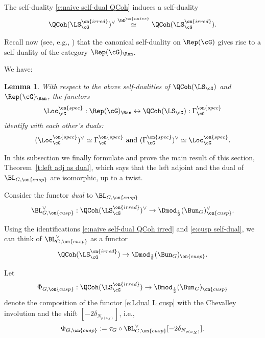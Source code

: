 \documentclass[9pt]{amsart}
\newtheorem{lem}[subsubsection]{Lemma}
\theoremstyle{remark}
\theoremstyle{definition}
\theoremstyle{remark}
\newcommand{\thmref}[1]{Theorem~\ref{#1}}
\numberwithin{equation}{section}
\begin{document}
\sssec{}

The self-duality \eqref{e:naive self-dual QCoh} induces a self-duality 
\begin{equation} \label{e:naive self-dual QCoh irred}
\QCoh(\LS^{\on{irred}}_\cG)^\vee \overset{\bD^{\on{naive}}}\simeq \QCoh(\LS^{\on{irred}}_\cG).
\end{equation} 

\sssec{}

Recall now (see, e.g.,  \cite[Sect. 11.3]{AGKRRV1}) that the canonical self-duality on $\Rep(\cG)$ gives rise to a self-duality of the category 
$\Rep(\cG)_\Ran$.

\sssec{}

We have:

\begin{lem} \label{l:Loc spec and dual}
With respect to the above self-dualities of $\QCoh(\LS_\cG)$ and $\Rep(\cG)_\Ran$, the 
functors 
$$\Loc_\cG^{\on{spec}}:\Rep(\cG)_\Ran \leftrightarrow \QCoh(\LS_\cG):\Gamma^{\on{spec}}_\cG$$
identify with each other's duals:
$$(\Loc_\cG^{\on{spec}})^\vee\simeq \Gamma^{\on{spec}}_\cG \text{ and }
(\Gamma^{\on{spec}}_\cG)^\vee \simeq \Loc_\cG^{\on{spec}}.$$
\end{lem} 


In this subsection we finally formulate and prove the main result of this section, \thmref{t:left adj as dual}, which says that
the left adjoint and the dual of $\BL_{G,\on{cusp}}$ are isomorphic, up to a twist. 

\sssec{} \label{sss:Phi cusp}

Consider the functor \emph{dual} to $\BL_{G,\on{cusp}}$
$$\BL_{G,\on{cusp}}^\vee: \QCoh(\LS_\cG^{\on{irred}})^\vee \to \Dmod_{\frac{1}{2}}(\Bun_G)_{\on{cusp}}^\vee.$$

Using the identifications \eqref{e:naive self-dual QCoh irred} and \eqref{e:cusp self-dual}, we can think of $\BL_{G,\on{cusp}}^\vee$ as a functor
\begin{equation} \label{e:Ldual L cusp}
\QCoh(\LS_\cG^{\on{irred}})\to \Dmod_{\frac{1}{2}}(\Bun_G)_{\on{cusp}}.
\end{equation}

Let
$$\Phi_{G,\on{cusp}}:\QCoh(\LS_\cG^{\on{irred}})\to \Dmod_{\frac{1}{2}}(\Bun_G)_{\on{cusp}}$$
denote the composition of the functor \eqref{e:Ldual L cusp} with the Chevalley involution and the shift $[-2\delta_{N_{\rho(\omega_X)}}]$, i.e., 
$$\Phi_{G,\on{cusp}}:=\tau_G\circ \BL_{G,\on{cusp}}^\vee[-2\delta_{N_{\rho(\omega_X)}}].$$
\end{document}
